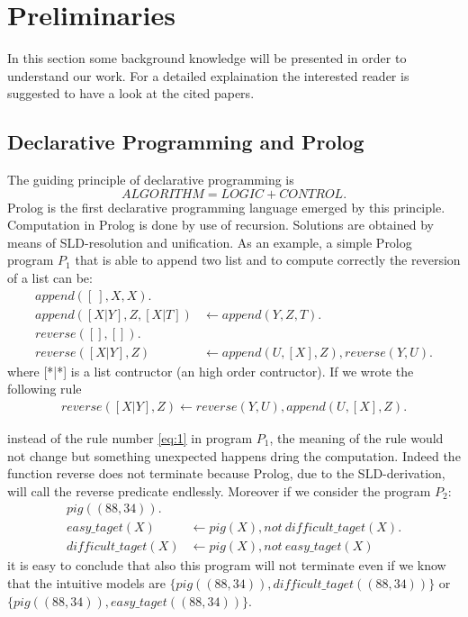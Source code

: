 \section{Preliminaries}
\label{sec:prelim}

In this section some background knowledge will be presented in order to understand our work. For a detailed explaination the interested reader is suggested to have a look at the cited papers. 
\subsection{Declarative Programming and Prolog}
The guiding principle of declarative programming is 
\[ALGORITHM = LOGIC + CONTROL.\]
Prolog is the first declarative programming language emerged by this principle. Computation in Prolog is done by use of recursion. Solutions are obtained by means of SLD-resolution and unification. As an example, a simple Prolog program \(P_1\) that  is able to append two list and to compute correctly the reversion of a list can be: 
\begin{align}
append ([\:], X, X).& \\
append ([X|Y], Z, [X|T ]) &\leftarrow append (Y, Z, T ). \\
reverse([ ], [ ]).&\\
reverse([X|Y ], Z) &\leftarrow append (U, [X], Z), reverse(Y, U ). \label{eq:1}
\end{align}
where [*|*] is a list contructor (an high order contructor).
If we wrote the following rule 
\begin{align}
reverse([X|Y ], Z) \leftarrow reverse(Y, U ), append(U, [X], Z). \label{eq:2}
\end{align}

instead of the rule number \ref{eq:1} in program \(P_1\), the meaning of the rule would not change but something unexpected happens dring the computation. Indeed the function reverse does not terminate because Prolog, due to the SLD-derivation, will call the reverse predicate endlessly. Moreover if we consider the program  \(P_2\):
\begin{align}
pig((88,34)).& \\
easy\_taget(X) &\leftarrow pig(X), not\: difficult\_taget(X). \\ 
difficult\_taget(X) &\leftarrow pig(X), not\: easy\_taget(X) 
\end{align}
it is easy to conclude that also this program will not terminate even if we know that the intuitive models are \(\{pig((88,34)), difficult\_taget((88,34))\}\) or \\ \(\{pig((88,34)), easy\_taget((88,34))\}\).

